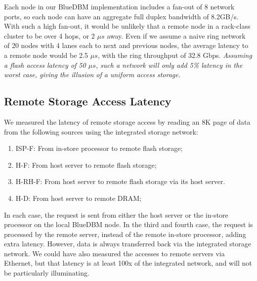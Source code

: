 Each node in our BlueDBM implementation includes a fan-out of 8 network
ports, so each node can have an aggregate full duplex bandwidth of 8.2GB/s. With
such a high fan-out, it would be unlikely that a remote node in a rack-class
cluster to be over 4 hops, or 2 $\mu s$ away. Even if we assume a naive ring
network of 20 nodes with 4 lanes each to next and previous nodes, the average
latency to a remote node would be 2.5 $\mu s$, with the ring throughput of 32.8
Gbps. \emph{Assuming a flash access latency of 50 $\mu s$, such a network will only add 5\% latency in the worst case, giving the illusion of a uniform access storage.}



\subsection{Remote Storage Access Latency}
\label{sec:latency}

We measured the latency of remote storage access by reading an 8K page of data from the following sources using the integrated storage network: 

\begin{enumerate}
\item ISP-F: From in-store processor to remote flash storage;
\item H-F: From host server to remote flash storage;
\item H-RH-F: From host server to remote flash storage via its host server.
\item H-D: From host server to remote DRAM; 
\end{enumerate}

In each case, the request is sent from either the host server or the in-store processor on the local BlueDBM node. In the third and fourth case, the request is processed by the remote server, instead of the remote in-store processor, adding extra latency. However, data is always transferred back via the integrated storage network. We could have also measured the accesses to remote servers via Ethernet, but that latency is at least 100x of the integrated network, and will not be particularly illuminating.


